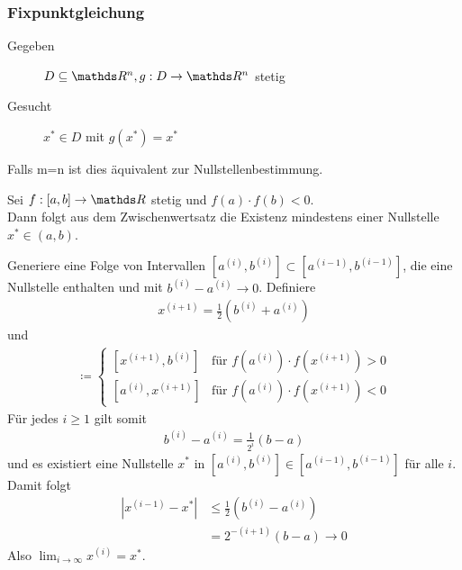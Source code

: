 \subsubsection{Fixpunktgleichung}
\begin{description}
\item[Gegeben]   $D\subseteq \R^n, g: D\rightarrow \R^n$ stetig
\item[Gesucht]      $x^{*}\in D $ mit $g(x^{*}) = x^{*}$
\end{description}
Falls m=n ist dies äquivalent zur Nullstellenbestimmung.

Sei $f:[a,b]\rightarrow \R $ stetig und $f(a) \cdot f(b) <0$.\\
Dann folgt aus dem Zwischenwertsatz die Existenz
mindestens einer Nullstelle $x^{*}\in (a,b)$.\\

\begin{image}{}
\end{image}

Generiere eine Folge von Intervallen
$[a^{(i)}, b^{(i)}]\subset  [a^{(i-1)}, b^{(i-1)}] $,
die eine Nullstelle enthalten und mit $b^{(i)}-a^{(i)} \longrightarrow 0$.
Definiere
\begin{gather}
  x^{(i+1)}= \frac{1}{2}(b^{(i)}+a^{(i)})
  \label{V.1.1}
\end{gather}
und
\begin{gather}
  [a^{(i+1)}, b^{(i+1)}] \coloneqq \begin{cases}
    [x^{(i+1)}, b^{(i)}] & \text{für } f(a^{(i)})\cdot f(x^{(i+1)}) > 0 \\
    [a^{(i)}, x^{(i+1)}] & \text{für } f(a^{(i)})\cdot f(x^{(i+1)}) < 0
  \end{cases}
  \label{V.1.2}
\end{gather}
Für jedes $i\geq 1$ gilt somit
\begin{gather*}
  b^{(i)}-a^{(i)} = \frac{1}{2^i}(b-a)
\end{gather*}
und es existiert eine Nullstelle $x^{*}$ in $[a^{(i)}, b^{(i)}]\in  [a^{(i-1)}, b^{(i-1)}] $
für alle $i$. \\
Damit folgt
\begin{align*}
  |x^{(i-1)}-x^{*}| &\leq \frac{1}{2}(b^{(i)}-a^{(i)}) \\
                    &=  2^{-(i+1)} (b-a) \longrightarrow 0
\end{align*}
Also $\lim_{i\rightarrow \infty}x^{(i)} = x^{*}$.


